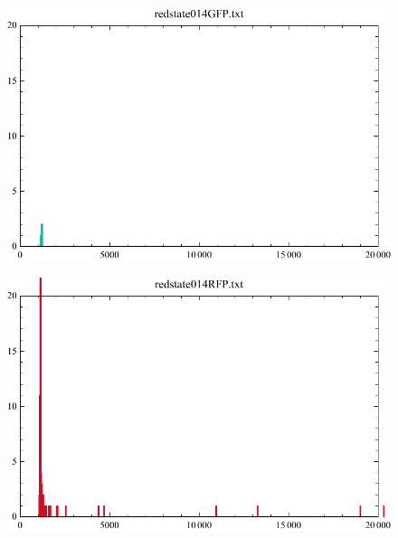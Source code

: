 \documentclass[11pt]{book}
\begin{document}
\begin{figure}[h]
\centering
	\begin{minipage}{.5\textwidth}
  		\centering
  		\includegraphics[width=.9\linewidth]{redstate014GFP.pdf}
  		\label{fig:onc2GFPRedState}
	\end{minipage}%
	\begin{minipage}{.5\textwidth}
  		\centering
  		\includegraphics[width=.9\linewidth]{redstate014RFP.pdf}
  		\label{fig:onc2RFPRedState}  
	\end{minipage}
\end{figure}
\end{document}
